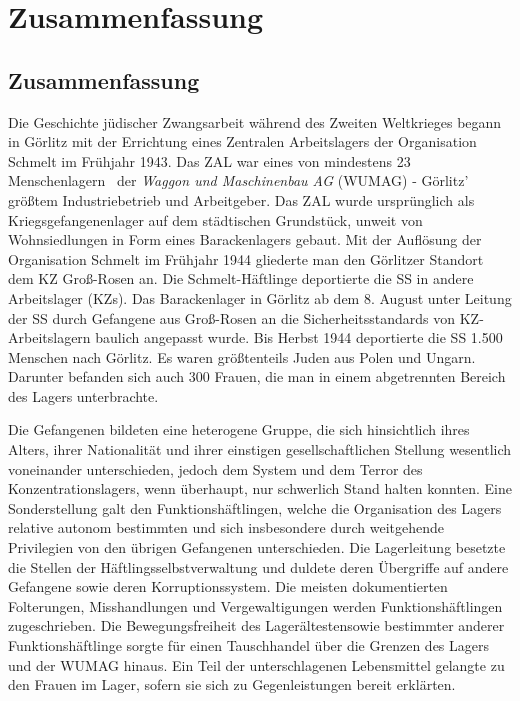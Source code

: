 \chapter{Zusammenfassung}

\section{Zusammenfassung}
Die Geschichte jüdischer Zwangsarbeit während des Zweiten Weltkrieges begann in Görlitz mit der Errichtung eines Zentralen Arbeitslagers der Organisation Schmelt im Frühjahr 1943. Das ZAL war eines von mindestens 23 \glqq Menschenlagern\grqq~ der \emph{Waggon und Maschinenbau AG} (WUMAG) - Görlitz' größtem Industriebetrieb und Arbeitgeber. Das ZAL wurde ursprünglich als Kriegsgefangenenlager auf dem städtischen Grundstück, unweit von Wohnsiedlungen in Form eines Barackenlagers gebaut. Mit der Auflösung der Organisation Schmelt im Frühjahr 1944 gliederte man den Görlitzer Standort dem KZ Groß-Rosen an. Die Schmelt-Häftlinge deportierte die SS in andere Arbeitslager (KZs). Das Barackenlager in Görlitz ab dem 8. August unter Leitung der SS durch Gefangene aus Groß-Rosen an die Sicherheitsstandards von KZ-Arbeitslagern baulich angepasst wurde. Bis Herbst 1944 deportierte die SS 1.500 Menschen nach Görlitz. Es waren größtenteils Juden aus Polen und Ungarn. Darunter befanden sich auch 300 Frauen, die man in einem abgetrennten Bereich des Lagers unterbrachte. 

Die Gefangenen bildeten eine heterogene Gruppe, die sich hinsichtlich ihres Alters, ihrer Nationalität und ihrer einstigen gesellschaftlichen Stellung wesentlich voneinander unterschieden, jedoch dem System und dem Terror des Konzentrationslagers, wenn überhaupt, nur schwerlich Stand halten konnten. Eine Sonderstellung galt den Funktionshäftlingen, welche die Organisation des Lagers relative autonom bestimmten und sich insbesondere durch weitgehende Privilegien von den übrigen Gefangenen unterschieden. Die Lagerleitung besetzte die Stellen der Häftlingsselbstverwaltung und duldete deren Übergriffe auf andere Gefangene sowie deren Korruptionssystem. Die meisten dokumentierten Folterungen, Misshandlungen und Vergewaltigungen werden Funktionshäftlingen zugeschrieben. Die Bewegungsfreiheit des Lagerältesten\linebreak\newpage sowie bestimmter anderer Funktionshäftlinge sorgte für einen Tauschhandel über die Grenzen des Lagers und der WUMAG hinaus. Ein Teil der unterschlagenen Lebensmittel gelangte zu den Frauen im Lager, sofern sie sich zu Gegenleistungen bereit erklärten. 

